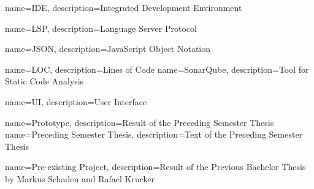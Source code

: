 {
	name=IDE,
	description={Integrated Development Environment}
}

{
	name=LSP,
	description={Language Server Protocol}
}

{
	name=JSON,
	description={JavaScript Object Notation}
}

{
	name=LOC,
	description={Lines of Code}
}
{
	name=SonarQube,
	description={Tool for Static Code Analysis}
}

{
	name=UI,
	description={User Interface}
}

{
	name=Prototype,
	description={Result of the Preceding Semester Thesis}
}
{
	name=Preceding Semester Thesis,
	description={Text of the Preceding Semester Thesis}
}

{
	name=Pre-existing Project,
	description={Result of the Previous Bachelor Thesis by Markus Schaden and Rafael Krucker}
}




